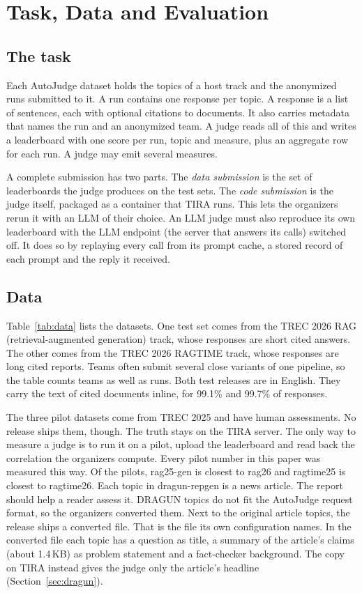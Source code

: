 \section{Task, Data and Evaluation}
\label{sec:task}

\subsection{The task}

Each AutoJudge dataset holds the topics of a host track and the anonymized runs
submitted to it. A run contains one response per topic. A response is a list of
sentences, each with optional citations to documents. It also carries metadata that
names the run and an anonymized team. A judge reads all of this and writes a
leaderboard with one score per run, topic and measure, plus an aggregate row for
each run. A judge may emit several measures.

A complete submission has two parts. The \emph{data submission} is the set of
leaderboards the judge produces on the test sets. The \emph{code submission} is the
judge itself, packaged as a container that TIRA runs. This lets the organizers rerun
it with an LLM of their choice. An LLM judge must also reproduce its own
leaderboard with the LLM endpoint (the server that answers its calls) switched
off. It does so by replaying every call from its prompt cache, a stored record of
each prompt and the reply it received.

\subsection{Data}

Table~\ref{tab:data} lists the datasets. One test set comes from the TREC 2026
RAG (retrieval-augmented generation) track, whose responses are short cited
answers. The other comes from the TREC 2026 RAGTIME track, whose responses are
long cited reports. Teams often submit several close variants of one pipeline,
so the table counts teams as well as runs. Both test releases are in English.
They carry the text of cited documents inline, for 99.1\% and 99.7\% of
responses.

The three pilot datasets come from TREC 2025 and have human assessments. No release
ships them, though. The truth stays on the TIRA server. The only way to measure a
judge is to run it on a pilot, upload the leaderboard and read back the correlation
the organizers compute. Every pilot number in this paper was measured this way.
Of the pilots, rag25-gen is closest to rag26 and ragtime25 is closest to ragtime26.
Each topic in dragun-repgen is a news article. The report should help a reader
assess it. DRAGUN topics do not fit the AutoJudge request format, so the organizers
converted them. Next to the original article topics, the release ships a converted
file. That is the file its own configuration names. In the converted file each
topic has a question as title, a summary of the article's claims (about 1.4\,KB) as
problem statement and a fact-checker background. The copy on TIRA instead gives
the judge only the article's headline (Section~\ref{sec:dragun}).

